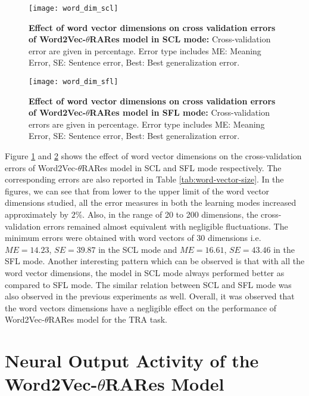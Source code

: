 \begin{figure}[hbtp]
\centering
\texttt{[image: word\_dim\_scl]}
\caption[Effect of word vector dimensions on Word2Vec-$\theta$RARes model in SCL mode.]{\textbf{Effect of word vector dimensions on cross validation errors of Word2Vec-$\theta$RARes model in SCL mode: } {\small Cross-validation error are given in percentage. Error type includes ME: Meaning Error, SE: Sentence error, Best: Best generalization error.}}
\label{fig:word_dim_scl}
\end{figure}

\begin{figure}[hbtp]
\centering
\texttt{[image: word\_dim\_sfl]}
\caption[Effect of word vector dimensions on Word2Vec-$\theta$RARes model in SFL mode.]{\textbf{Effect of word vector dimensions on cross validation errors of Word2Vec-$\theta$RARes model in SFL mode: }{\small Cross-validation errors are given in percentage. Error type includes ME: Meaning Error, SE: Sentence error, Best: Best generalization error.}}
\label{fig:word_dim_sfl}
\end{figure}

Figure \ref{fig:word_dim_scl} and \ref{fig:word_dim_sfl} shows the effect of word vector dimensions on the cross-validation errors of Word2Vec-$\theta$RARes model in SCL and SFL mode respectively. The corresponding errors are also reported in Table \ref{tab:word-vector-size}. In the figures, we can see that from lower to the upper limit of the word vector dimensions studied, all the error measures in both the learning modes increased approximately by $2\%$. Also, in the range of 20 to 200 dimensions, the cross-validation errors remained almost equivalent with negligible fluctuations. The minimum errors were obtained with word vectors of 30 dimensions i.e. $ME= 14.23$, $SE= 39.87$ in the SCL mode and $ME= 16.61$, $SE= 43.46$ in the SFL mode. Another interesting pattern which can be observed is that with all the word vector dimensions, the model in SCL mode always performed better as compared to SFL mode. The similar relation between SCL and SFL mode was also observed in the previous experiments as well. Overall, it was observed that the word vectors dimensions have a negligible effect on the performance of Word2Vec-$\theta$RARes model for the TRA task.

\section{Neural Output Activity of the Word2Vec-$\theta$RARes Model}

